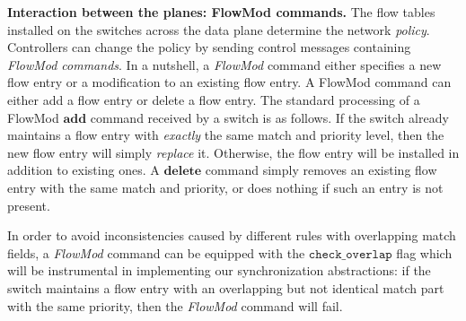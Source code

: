 \documentclass[conference]{sigcomm-alternate}
\newcommand{\add}{\textbf{add}\xspace}
\newcommand{\dele}{\textbf{delete}\xspace}
\newcommand{\checko}{\texttt{check\_overlap}\xspace}
\newcommand{\liron}[1]{\textit{\textcolor{mypurple}{[liron]: #1}}} %
\newcommand{\petr}[1]{\textit{\textcolor{blue}{[petr]: #1}}} %
\begin{document}
\vspace{1mm}
\noindent\textbf{Interaction between the planes: FlowMod commands.}
The flow tables installed on the switches across the data plane
determine the network \emph{policy}.
Controllers can change the policy by sending
control messages containing \emph{FlowMod commands}.
In a nutshell, a \emph{FlowMod} command either specifies a new flow entry or
a modification to an existing flow entry.
%
%
%
%
A FlowMod command can either add a flow entry or delete a flow entry.
The standard processing of a FlowMod $\add$ command received by a switch is
as follows.
If the switch already maintains a flow entry with \emph{exactly} the
same match and priority level, then the new flow entry will simply \emph{replace} it.
Otherwise, the flow entry will be installed in addition to existing
ones.
A $\dele$ command simply removes an existing flow entry with the same
match and priority,  or does nothing if such an entry is not present.



In order to avoid inconsistencies caused by different rules with
overlapping match fields, a \emph{FlowMod} command can be equipped with 
the $\checko$ flag which will be instrumental
in implementing our synchronization abstractions:
if the switch maintains a flow entry with an overlapping but not
identical match part with the same priority, then
the \emph{FlowMod} command will fail.
\end{document}
